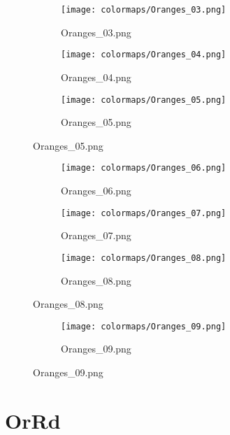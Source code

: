 \documentclass{article}%
\begin{document}
\begin{figure}[h!]%
\begin{subfigure}[b]{0.3\linewidth}%
\texttt{[image: colormaps/Oranges\_03.png]}%
\caption{Oranges\_03.png}%
\end{subfigure}%
\begin{subfigure}[b]{0.3\linewidth}%
\texttt{[image: colormaps/Oranges\_04.png]}%
\caption{Oranges\_04.png}%
\end{subfigure}%
\begin{subfigure}[b]{0.3\linewidth}%
\texttt{[image: colormaps/Oranges\_05.png]}%
\caption{Oranges\_05.png}%
\end{subfigure}%
\end{figure}

%
\hspace{1cm}\hfill%
\hspace{1cm}\hfill%
\hspace{1cm}\hfill%


\begin{figure}[h!]%
\begin{subfigure}[b]{0.3\linewidth}%
\texttt{[image: colormaps/Oranges\_06.png]}%
\caption{Oranges\_06.png}%
\end{subfigure}%
\begin{subfigure}[b]{0.3\linewidth}%
\texttt{[image: colormaps/Oranges\_07.png]}%
\caption{Oranges\_07.png}%
\end{subfigure}%
\begin{subfigure}[b]{0.3\linewidth}%
\texttt{[image: colormaps/Oranges\_08.png]}%
\caption{Oranges\_08.png}%
\end{subfigure}%
\end{figure}

%
\hspace{1cm}\hfill%


\begin{figure}[h!]%
\begin{subfigure}[b]{0.3\linewidth}%
\texttt{[image: colormaps/Oranges\_09.png]}%
\caption{Oranges\_09.png}%
\end{subfigure}%
\end{figure}

%
\newpage%
\section{OrRd}%
\label{sec:OrRd}%
\hspace{1cm}\hfill%
\hspace{1cm}\hfill%
\hspace{1cm}\hfill%
\end{document}
